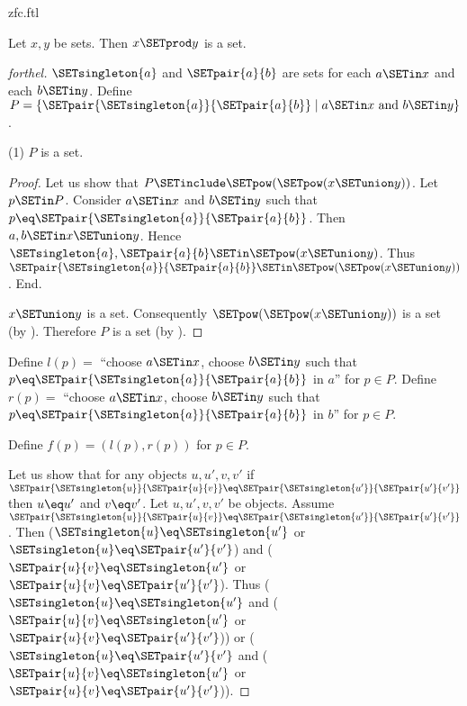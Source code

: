 \documentclass{stex}
\begin{document}
\begin{smodule}{zfc.ftl}
\begin{proposition}[forthel,id=FOUNDATIONS_10_4458706448154624]
  Let $x, y$ be sets.
  Then $x \SETprod y$ is a set.
\end{proposition}
\begin{proof}[forthel]
  $\SETsingleton{a}$ and $\SETpair{a}{b}$ are sets for each $a \SETin x$ and each $b \SETin y$.
  Define $P = \{ \SETpair{\SETsingleton{a}}{\SETpair{a}{b}} \mid a \SETin x\text{ and }b \SETin y \}$.

  (1) $P$ is a set.
  \begin{proof}
    Let us show that $P \SETinclude \SETpow(\SETpow(x \SETunion y))$.
      Let $p \SETin P$.
      Consider $a \SETin x$ and $b \SETin y$ such that $p \eq \SETpair{\SETsingleton{a}}{\SETpair{a}{b}}$.
      Then $a, b \SETin x \SETunion y$.
      Hence $\SETsingleton{a}, \SETpair{a}{b} \SETin \SETpow(x \SETunion y)$.
      Thus $\SETpair{\SETsingleton{a}}{\SETpair{a}{b}} \SETin \SETpow(\SETpow(x \SETunion y))$.
    End.

    $x \SETunion y$ is a set.
    Consequently $\SETpow(\SETpow(x \SETunion y))$ is a set (by ).
    Therefore $P$ is a set (by ).
  \end{proof}

  Define $l(p) =$ ``choose $a \SETin x$, choose $b \SETin y$ such that $p \eq \SETpair{\SETsingleton{a}}{\SETpair{a}{b}}$ in $a$'' for $p \in P$.
  Define $r(p) =$ ``choose $a \SETin x$, choose $b \SETin y$ such that $p \eq \SETpair{\SETsingleton{a}}{\SETpair{a}{b}}$ in $b$'' for $p \in P$.

  Define $f(p) = (l(p), r(p))$ for $p \in P$.

  Let us show that for any objects $u, u', v, v'$ if
  $\SETpair{\SETsingleton{u}}{\SETpair{u}{v}} \eq \SETpair{\SETsingleton{u'}}{\SETpair{u'}{v'}}$ then $u \eq u'$ and $v \eq v'$.
    Let $u, u', v, v'$ be objects.
    Assume $\SETpair{\SETsingleton{u}}{\SETpair{u}{v}} \eq \SETpair{\SETsingleton{u'}}{\SETpair{u'}{v'}}$.
    Then ($\SETsingleton{u} \eq \SETsingleton{u'}$ or $\SETsingleton{u} \eq \SETpair{u'}{v'}$) and ($\SETpair{u}{v} \eq \SETsingleton{u'}$ or $\SETpair{u}{v} \eq \SETpair{u'}{v'}$).
    Thus ($\SETsingleton{u} \eq \SETsingleton{u'}$ and ($\SETpair{u}{v} \eq \SETsingleton{u'}$ or $\SETpair{u}{v} \eq \SETpair{u'}{v'}$)) or ($\SETsingleton{u} \eq \SETpair{u'}{v'}$ and ($\SETpair{u}{v} \eq \SETsingleton{u'}$ or $\SETpair{u}{v} \eq \SETpair{u'}{v'}$)).


\end{proof}
\end{smodule}
\end{document}
